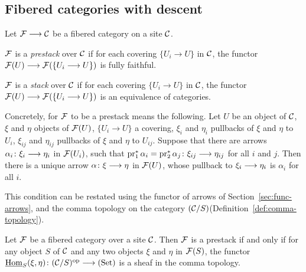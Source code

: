 \begin{4   STACKS}
\begin{4.1 Descent of objects of fibcats}
\subsection{Fibered categories with descent}
\label{sec:fibered-descent}

\begin{definition} Let $\cF \arr \cC$ be a fibered category on a site $\mathcal{C}$.

\begin{enumeratei}

\item $\mathcal{F}$ is a \emph{prestack} over $\mathcal{C}$ if for each covering $\{U_i \to U\}$ in $\mathcal{C}$, the functor $\cF(U) \arr \cF(\{U_i \to U\})$ is fully faithful.

\item $\mathcal{F}$ is a \emph{stack} over $\mathcal{C}$ if for each covering $\{U_i \to U\}$ in $\mathcal{C}$, the functor $\cF(U) \arr \cF(\{U_i \to U\})$ is an equivalence of categories.

\end{enumeratei}
\end{definition}

Concretely, for $\mathcal{F}$ to be a prestack means the following. Let $U$ be an object of $\mathcal{C}$, $\xi$ and $\eta$ objects of $\mathcal{F}(U)$, $\{U_i \to U\}$ a covering, $\xi_i$ and $\eta_i$ pullbacks of $\xi$ and $\eta$ to $U_i$, $\xi_{ij}$ and $\eta_{ij}$ pullbacks of $\xi$ and $\eta$ to $U_{ij}$. Suppose that there are arrows $\alpha_i \colon \xi_i \arr \eta_i$ in $\mathcal{F}(U_i)$, such that $\pr_1^* \alpha_i = \pr_2^* \alpha_j \colon \xi_{ij}  \arr \eta_{ij}$ for all $i$ and $j$. Then there is a unique arrow $\alpha \colon \xi \arr \eta$ in $\mathcal{F}(U)$, whose pullback to $\xi_i \arr \eta_i$ is $\alpha_i$ for all $i$.

This condition can be restated using the functor of arrows of Section~\ref{sec:func-arrows}, and the comma topology on the category $(\mathcal{C}/S)$(Definition~\ref{def:comma-topology}).


\begin{proposition}
Let $\mathcal{F}$ be a fibered category over a site $\mathcal{C}$. Then $\mathcal{F}$ is a prestack if and only if for any object $S$ of $\mathcal{C}$ and any two objects $\xi$ and $\eta$ in $\mathcal{F}(S)$, the functor $\underhom_S(\xi, \eta) \colon (\cC/S)\op \arr \catset$ is a sheaf in the comma topology.
\end{proposition}



\end{4.1 Descent of objects of fibcats}
\end{4   STACKS}
